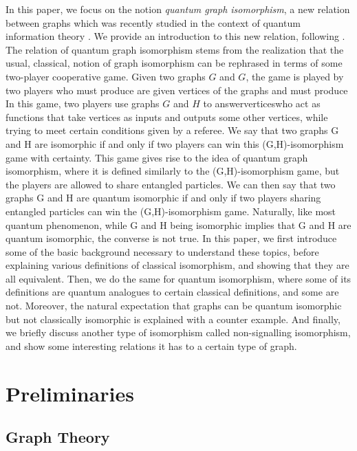 \documentclass[12pt]{article}
\begin{document}
In this paper, we focus on the notion \emph{quantum graph
  isomorphism}, a new relation between graphs which was recently
studied in the context of quantum information theory \cite{laura,
  musto2018, QuanPerm, GraphHom, QuanMonad}. We provide an
introduction to this new relation, following \cite{laura}. The
relation of quantum graph isomorphism stems from the realization that
the usual, classical, notion of graph isomorphism can be rephrased in
terms of some two-player cooperative game. Given two graphs $G$ and
$G$, the game is played by two players who must produce are given
vertices of the graphs and must produce In this game, two players use
graphs $G$ and $H$ to answerverticeswho act as functions that take
vertices as inputs and outputs some other vertices, while trying to
meet certain conditions given by a referee. We say that two graphs G
and H are isomorphic if and only if two players can win this
(G,H)-isomorphism game with certainty. This game gives rise to the
idea of quantum graph isomorphism, where it is defined similarly to
the (G,H)-isomorphism game, but the players are allowed to share
entangled particles. We can then say that two graphs G and H are
quantum isomorphic if and only if two players sharing entangled
particles can win the (G,H)-isomorphism game. Naturally, like most
quantum phenomenon, while G and H being isomorphic implies that G and
H are quantum isomorphic, the converse is not true. In this paper, we
first introduce some of the basic background necessary to understand
these topics, before explaining various definitions of classical
isomorphism, and showing that they are all equivalent. Then, we do the
same for quantum isomorphism, where some of its definitions are
quantum analogues to certain classical definitions, and some are
not. Moreover, the natural expectation that graphs can be quantum
isomorphic but not classically isomorphic is explained with a counter
example. And finally, we briefly discuss another type of isomorphism
called non-signalling isomorphism, and show some interesting relations
it has to a certain type of graph.

\section{Preliminaries}
\label{sec:prelim}

\subsection{Graph Theory}
\label{ssec:graphtheory}
\end{document}
